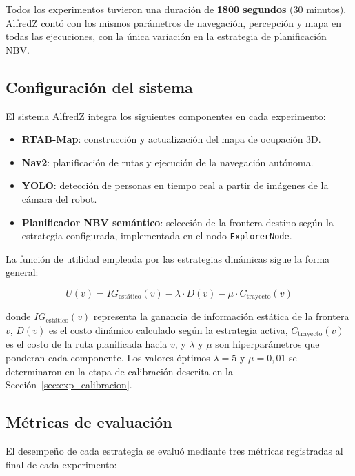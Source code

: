 Todos los experimentos tuvieron una duración de \textbf{1800 segundos} (30 minutos). AlfredZ contó con los mismos parámetros de navegación, percepción y mapa en todas las ejecuciones, con la única variación en la estrategia de planificación NBV\@.

\subsection{Configuración del sistema}

El sistema AlfredZ integra los siguientes componentes en cada experimento:

\begin{itemize}
    \item \textbf{RTAB-Map}: construcción y actualización del mapa de ocupación 3D.
    \item \textbf{Nav2}: planificación de rutas y ejecución de la navegación autónoma.
    \item \textbf{YOLO}: detección de personas en tiempo real a partir de imágenes de la cámara del robot.
    \item \textbf{Planificador NBV semántico}: selección de la frontera destino según la estrategia configurada, implementada en el nodo \texttt{ExplorerNode}.
\end{itemize}

La función de utilidad empleada por las estrategias dinámicas sigue la forma general:

\begin{equation}
    U(v) = IG_{\text{estático}}(v) - \lambda \cdot D(v) - \mu \cdot C_{\text{trayecto}}(v)
    \label{eq:utilidad}
\end{equation}

\noindent donde $IG_{\text{estático}}(v)$ representa la ganancia de información estática de la frontera $v$, $D(v)$ es el costo dinámico calculado según la estrategia activa, $C_{\text{trayecto}}(v)$ es el costo de la ruta planificada hacia $v$, y $\lambda$ y $\mu$ son hiperparámetros que ponderan cada componente. Los valores óptimos $\lambda = 5$ y $\mu = 0{,}01$ se determinaron en la etapa de calibración descrita en la Sección~\ref{sec:exp_calibracion}.

\subsection{Métricas de evaluación}

El desempeño de cada estrategia se evaluó mediante tres métricas registradas al final de cada experimento:

